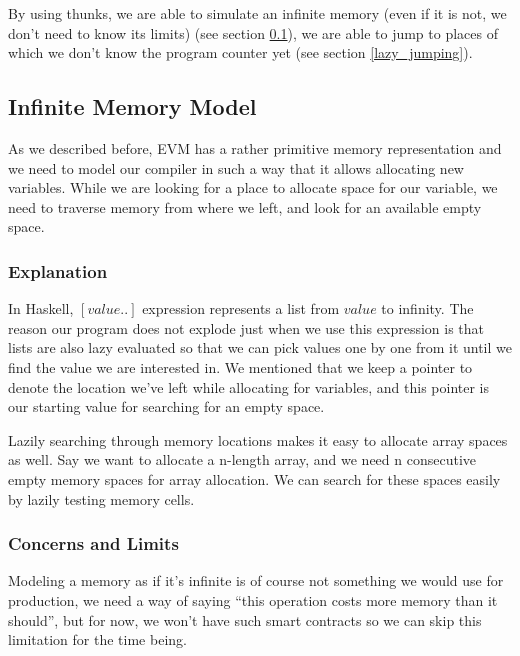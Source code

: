 \documentclass{article}
\begin{document}
By using thunks, we are able to simulate an infinite memory (even if it is not, we don't need to know its limits) (see section \ref{infinite_memory}), we are able to jump to places of which we don't know the program counter yet (see section \ref{lazy_jumping}).
\subsection{Infinite Memory Model}
\label{infinite_memory}
As we described before, EVM has a rather primitive memory representation and we need to model our compiler in such a way that it allows allocating new variables. While we are looking for a place to allocate space for our variable, we need to traverse memory from where we left, and look for an available empty space.

\subsubsection{Explanation}
In Haskell, $[value..]$ expression represents a list from $value$ to infinity. The reason our program does not explode just when we use this expression is that lists are also lazy evaluated so that we can pick values one by one from it until we find the value we are interested in. We mentioned that we keep a pointer to denote the location we've left while allocating for variables, and this pointer is our starting value for searching for an empty space.

Lazily searching through memory locations makes it easy to allocate array spaces as well. Say we want to allocate a n-length array, and we need n consecutive empty memory spaces for array allocation. We can search for these spaces easily by lazily testing memory cells.
\subsubsection{Concerns and Limits}
\label{infinite_memory_model}
Modeling a memory as if it's infinite is of course not something we would use for production, we need a way of saying ``this operation costs more memory than it should'', but for now, we won't have such smart contracts so we can skip this limitation for the time being.
\end{document}
